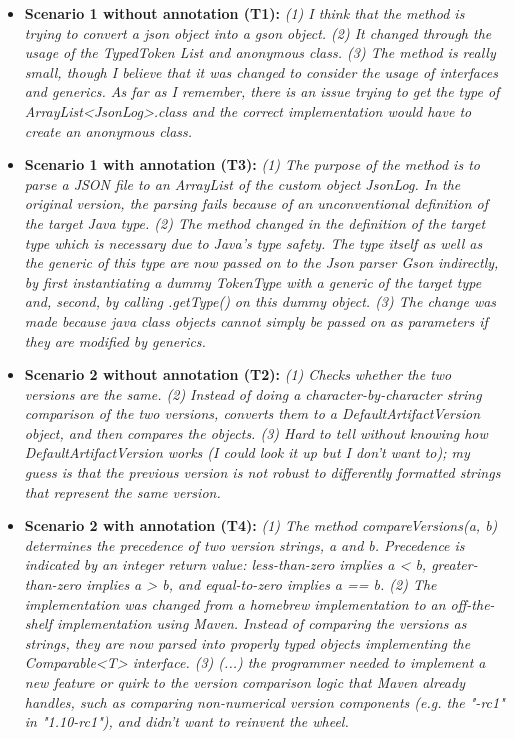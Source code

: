 \documentclass[../manifest.tex]{subfiles}
\begin{document}
\begin{itemize}
  \item \textbf{Scenario 1 without annotation (T1):}
\textit{
(1) I think that the method is trying to convert a json object into a gson object.
(2) It changed through the usage of the TypedToken List and anonymous class.
(3) The method is really small, though I believe that it was changed to consider the usage of interfaces and generics. As far as I remember, there is an issue trying to get the type of  ArrayList<JsonLog>.class and the correct implementation would have to create an anonymous class.
}
  \item \textbf{Scenario 1 with annotation (T3):}
\textit{
(1) The purpose of the method is to parse a JSON file to an ArrayList of the custom object JsonLog. In the original version, the parsing fails because of an unconventional definition of the target Java type. (2) The method changed in the definition of the target type which is necessary due to Java's type safety. The type itself as well as the generic of this type are now passed on to the Json parser Gson indirectly, by first instantiating a dummy TokenType with a generic of the target type and, second, by calling .getType() on this dummy object. (3) The change was made because java class objects cannot simply be passed on as parameters if they are modified by generics.
}
  \item \textbf{Scenario 2 without annotation (T2):}
\textit{
(1) Checks whether the two versions are the same. (2) Instead of doing a character-by-character string comparison of the two versions, converts them to a DefaultArtifactVersion object, and then compares the objects. (3) Hard to tell without knowing how DefaultArtifactVersion works (I could look it up but I don't want to); my guess is that the previous version is not robust to differently formatted strings that represent the same version.
}
  \item \textbf{Scenario 2 with annotation (T4):}
\textit{
(1) The method compareVersions(a, b) determines the precedence of two version strings, a and b. Precedence is indicated by an integer return value: less-than-zero implies a < b, greater-than-zero implies a > b, and equal-to-zero implies a == b. (2) The implementation was changed from a homebrew implementation to an off-the-shelf implementation using Maven. Instead of comparing the versions as strings, they are now parsed into properly typed objects implementing the Comparable<T> interface. (3) (...) the programmer needed to implement a new feature or quirk to the version comparison logic that Maven already handles, such as comparing non-numerical version components (e.g. the "-rc1" in "1.10-rc1"), and didn't want to reinvent the wheel.
}
\end{itemize}
\end{document}
